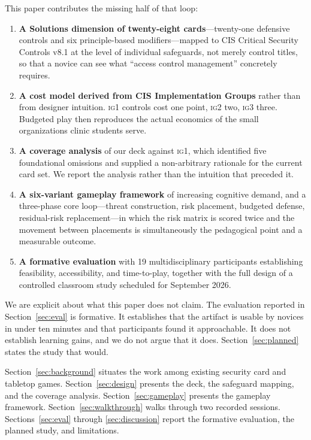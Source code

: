 \documentclass[10pt,twocolumn,letterpaper]{article}
\newcommand{\ig}[1]{\textsc{ig#1}}
\begin{document}
This paper contributes the missing half of that loop:

\begin{enumerate}[label=(\arabic*)]
\item \textbf{A Solutions dimension of twenty-eight cards}---twenty-one
defensive controls and six principle-based modifiers---mapped to CIS
Critical Security Controls v8.1 \cite{cis2024controls} at the level of
individual safeguards, not merely control titles, so that a novice can see what
``access control management'' concretely requires.
\item \textbf{A cost model derived from CIS Implementation Groups}
\cite{cis_ig} rather than from designer intuition. \ig{1} controls cost one
point, \ig{2} two, \ig{3} three. Budgeted play then reproduces the actual
economics of the small organizations clinic students serve.
\item \textbf{A coverage analysis} of our deck against \ig{1}, which
identified five foundational omissions and supplied a non-arbitrary rationale
for the current card set. We report the analysis rather than the intuition
that preceded it.
\item \textbf{A six-variant gameplay framework} of increasing cognitive
demand, and a three-phase core loop---threat construction, risk placement,
budgeted defense, residual-risk replacement---in which the risk matrix is
scored twice and the movement between placements is simultaneously the
pedagogical point and a measurable outcome.
\item \textbf{A formative evaluation} with 19 multidisciplinary participants
establishing feasibility, accessibility, and time-to-play, together with the
full design of a controlled classroom study scheduled for September 2026.
\end{enumerate}

We are explicit about what this paper does not claim. The evaluation reported
in Section~\ref{sec:eval} is formative. It establishes that the artifact is
usable by novices in under ten minutes and that participants found it
approachable. It does not establish learning gains, and we do not argue that it
does. Section~\ref{sec:planned} states the study that would.

Section~\ref{sec:background} situates the work among existing security card and
tabletop games. Section~\ref{sec:design} presents the deck, the safeguard
mapping, and the coverage analysis. Section~\ref{sec:gameplay} presents the
gameplay framework. Section~\ref{sec:walkthrough} walks through two recorded
sessions. Sections~\ref{sec:eval} through \ref{sec:discussion} report the
formative evaluation, the planned study, and limitations.
\end{document}
